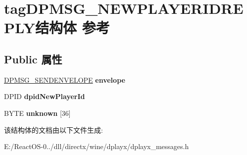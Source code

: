 \hypertarget{structtag_d_p_m_s_g___n_e_w_p_l_a_y_e_r_i_d_r_e_p_l_y}{}\section{tag\+D\+P\+M\+S\+G\+\_\+\+N\+E\+W\+P\+L\+A\+Y\+E\+R\+I\+D\+R\+E\+P\+L\+Y结构体 参考}
\label{structtag_d_p_m_s_g___n_e_w_p_l_a_y_e_r_i_d_r_e_p_l_y}
\subsection*{Public 属性}
\begin{DoxyCompactItemize}
\item 
\mbox{\label{structtag_d_p_m_s_g___n_e_w_p_l_a_y_e_r_i_d_r_e_p_l_y_a82d94f0c9aae7fb08c5cbe428d06da03}} 
\hyperlink{structtag_d_p_m_s_g___s_e_n_d_e_n_v_e_l_o_p_e}{D\+P\+M\+S\+G\+\_\+\+S\+E\+N\+D\+E\+N\+V\+E\+L\+O\+PE} {\bfseries envelope}
\item 
\mbox{\label{structtag_d_p_m_s_g___n_e_w_p_l_a_y_e_r_i_d_r_e_p_l_y_a6ded759451eb2c8bd41f3ecd99059d1b}} 
D\+P\+ID {\bfseries dpid\+New\+Player\+Id}
\item 
\mbox{\label{structtag_d_p_m_s_g___n_e_w_p_l_a_y_e_r_i_d_r_e_p_l_y_ad77ca0825cb2077ebb44f93af2a2780f}} 
B\+Y\+TE {\bfseries unknown} \mbox{[}36\mbox{]}
\end{DoxyCompactItemize}


该结构体的文档由以下文件生成\+:\begin{DoxyCompactItemize}
\item 
E\+:/\+React\+O\+S-\/0../dll/directx/wine/dplayx/dplayx\+\_\+messages.\+h\end{DoxyCompactItemize}
